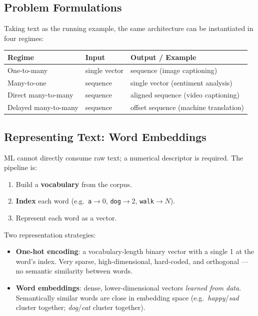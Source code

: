 \documentclass[11pt,a4paper]{article}
\theoremstyle{definition}
\theoremstyle{plain}
\theoremstyle{remark}
\begin{document}
\subsection{Problem Formulations}

Taking text as the running example, the same architecture can be instantiated in four regimes:

\begin{center}
\begin{tabular}{lll}
\textbf{Regime} & \textbf{Input} & \textbf{Output / Example} \\
\hline
One-to-many   & single vector   & sequence (image captioning) \\
Many-to-one   & sequence        & single vector (sentiment analysis) \\
Direct many-to-many  & sequence & aligned sequence (video captioning) \\
Delayed many-to-many & sequence & offset sequence (machine translation) \\
\end{tabular}
\end{center}

\subsection{Representing Text: Word Embeddings}

ML cannot directly consume raw text; a numerical descriptor is required. The pipeline is:

\begin{enumerate}
    \item Build a \textbf{vocabulary} from the corpus.
    \item \textbf{Index} each word (e.g.\ \texttt{a}$\to$0, \texttt{dog}$\to$2, \texttt{walk}$\to N$).
    \item Represent each word as a vector.
\end{enumerate}

Two representation strategies:

\begin{itemize}
    \item \textbf{One-hot encoding}: a vocabulary-length binary vector with a single 1 at the word's index. Very sparse, high-dimensional, hard-coded, and orthogonal --- no semantic similarity between words.
    \item \textbf{Word embeddings}: dense, lower-dimensional vectors \emph{learned from data}. Semantically similar words are close in embedding space (e.g.\ \textit{happy}/\textit{sad} cluster together; \textit{dog}/\textit{cat} cluster together).
\end{itemize}
\end{document}
